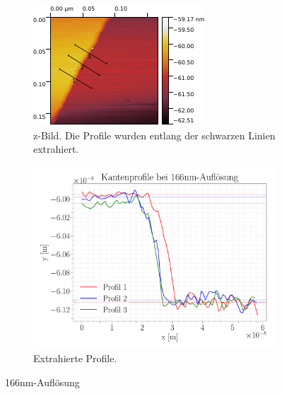 \begin{figure}[H]
	\centering
	\begin{subfigure}{0.49\textwidth}
		\centering
\includegraphics[width=\textwidth]{../Gwyddion/HOPG/166nm.pdf}
\caption{z-Bild. Die Profile wurden entlang der schwarzen Linien extrahiert.}
\label{166nm}
	\end{subfigure}
	\begin{subfigure}{0.5\textwidth}
		\centering
\includegraphics[width=\textwidth]{../Figures/166nm_profiles.pdf}
\caption{Extrahierte Profile.}
\label{166nmProfiles}
	\end{subfigure}
	
	\caption{{166}{nm}-Auflösung}
\end{figure}

